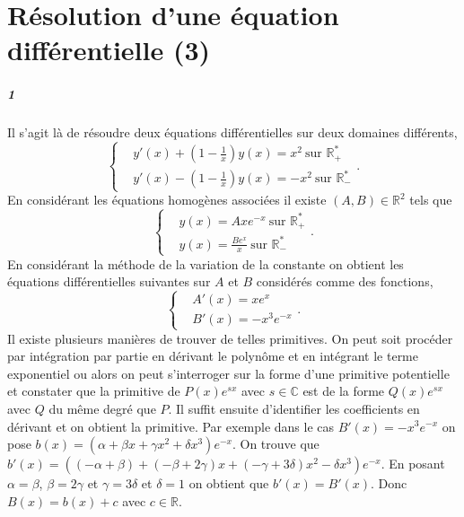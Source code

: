 \documentclass[10pt,a4paper]{article}
\begin{document}
\section{Résolution d'une équation différentielle (3)}
\subparagraph{1}Il s'agit là de résoudre deux équations différentielles sur deux domaines différents,
\begin{equation*}
\left\lbrace
\begin{aligned}
&y'(x) + (1 - \frac{1}{x})y(x) = x^2 \ \text{sur } \mathbb{R}_+^* \\
&y'(x) - (1 - \frac{1}{x})y(x) = -x^2 \ \text{sur } \mathbb{R}_-^*
\end{aligned}
\right. .
\end{equation*}
En considérant les équations homogènes associées il existe $(A,B) \in \mathbb{R}^2$ tels que
\begin{equation*}
\left\lbrace
\begin{aligned}
& y(x) = A x e^{-x} \ \text{sur } \mathbb{R}_+^* \\
& y(x) = \frac{Be^x}{x} \ \text{sur } \mathbb{R}_-^*
\end{aligned}
\right. .
\end{equation*}
En considérant la méthode de la variation de la constante on obtient les équations différentielles suivantes sur $A$ et $B$ considérés comme des fonctions,
\begin{equation*}
\left\lbrace
\begin{aligned}
&A'(x) = xe^x \\
&B'(x) = -x^3e^{-x}
\end{aligned}
\right. .
\end{equation*}
Il existe plusieurs manières de trouver de telles primitives. On peut soit procéder par intégration par partie en dérivant le polynôme et en intégrant le terme exponentiel ou alors on peut s'interroger sur la forme d'une primitive potentielle et constater que la primitive de $P(x)e^{s x}$ avec $s \in \mathbb{C}$ est de la forme $Q(x)e^{s x}$ avec $Q$ du même degré que $P$. Il suffit ensuite d'identifier les coefficients en dérivant et on obtient la primitive. Par exemple dans le cas $B'(x) = -x^3e^{-x}$ on pose $b(x) = (\alpha + \beta x + \gamma x^2 + \delta x^3) e^{-x}$. On trouve que $b'(x) = \left( (-\alpha + \beta) + (-\beta + 2 \gamma)x + (-\gamma + 3 \delta)x^2 - \delta x^3 \right)e^{-x}$. En posant $\alpha = \beta$, $\beta = 2\gamma$ et $\gamma = 3\delta$ et $\delta = 1$ on obtient que $b'(x) = B'(x)$. Donc $B(x) = b(x) + c$ avec $c \in \mathbb{R}$.
\end{document}
